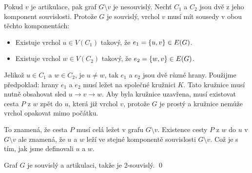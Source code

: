 \documentclass[11pt,a4paper]{article}
\begin{document}
\begin{solution}
Pokud $v$ je artikulace, pak graf $G \setminus v$ je nesouvislý. Nechť $C_1$ a $C_2$ jsou dvě z jeho komponent 
souvislosti. Protože $G$ je souvislý, vrchol $v$ musí mít sousedy v obou těchto komponentách:
\vspace{-1em}
\begin{itemize}[noitemsep]
    \item Existuje vrchol $u \in V(C_1)$ takový, že $e_1 = \left\lbrace u,v \right\rbrace \in E(G)$.
    \item Existuje vrchol $w \in V(C_2)$ takový, že $e_2 = \left\lbrace w,v \right\rbrace \in E(G)$.
\end{itemize}
\vspace{-1em}
Jelikož $u \in C_1$ a $w \in C_2$, je $u \not= w$, tak $e_1$ a $e_2$ jsou dvě různé hrany. Použijme předpoklad: hrany 
$e_1$ a $e_2$ musí ležet na společné kružnici $K$. Tato kružnice musí nutně obsahovat sled 
$u \rightarrow v \rightarrow w$. Aby byla kružnice uzavřena, musí existovat cesta $P$ z $w$ zpět do $u$, která již 
 vrchol $v$, protože $G$ je prostý a kružnice nemůže vrchol opakovat mimo počátku.

To znamená, že cesta $P$ musí celá ležet v grafu $G \setminus v$. Existence cesty $P$ z $w$ do $u$ v $G \setminus v$ ale 
znamená, že $u$ a $w$ leží ve stejné komponentě souvislosti $G \setminus v$. Což je  s tím, jak jsme definovali 
$u$ a $w$.

Graf $G$ je souvislý a  artikulaci, takže je 2-souvislý.
\hspace{\fill}\qed
\end{solution}
\end{document}
